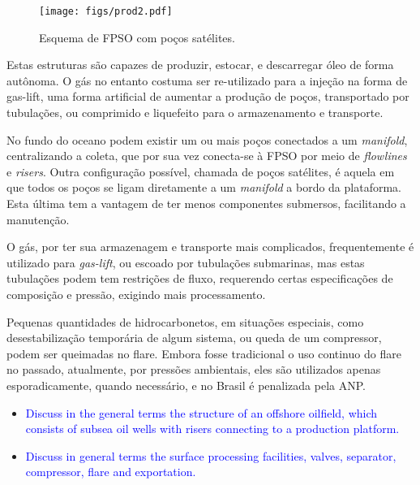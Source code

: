 \begin{figure}
\centering
  \texttt{[image: figs/prod2.pdf]}
  \caption{Esquema de FPSO com poços satélites.}
  \label{fig:fpso1}
\end{figure}





Estas estruturas são capazes de produzir, estocar, e descarregar óleo de forma autônoma. O gás no entanto costuma ser re-utilizado para a injeção na forma de gas-lift, uma forma artificial de aumentar a produção de poços, transportado por tubulações, ou comprimido e liquefeito para o armazenamento e transporte.

No fundo do oceano podem existir um ou mais poços conectados a um \textit{manifold}, centralizando a coleta, que por sua vez conecta-se à FPSO por meio de \textit{flowlines} e \textit{risers}. Outra configuração possível, chamada de poços satélites, é aquela em que todos os poços se ligam diretamente a um \textit{manifold} a bordo da plataforma. Esta última tem a vantagem de ter menos componentes submersos, facilitando a manutenção.


O gás, por ter sua armazenagem e transporte mais complicados, frequentemente é utilizado para \textit{gas-lift}, ou escoado por tubulações submarinas, mas estas tubulações podem tem restrições de fluxo, requerendo certas especificações de composição e pressão, exigindo mais processamento.

Pequenas quantidades de hidrocarbonetos, em situações especiais, como desestabilização temporária de algum sistema, ou queda de um compressor, podem ser queimadas no flare. Embora fosse tradicional o uso continuo do flare no passado, atualmente, por pressões ambientais, eles são utilizados apenas esporadicamente, quando necessário, e no Brasil é penalizada pela ANP.

\begin{itemize}

\item \textcolor{blue}{Discuss in the general terms the structure of an offshore oilfield, which consists of subsea oil wells with risers connecting to a production platform.}


\item \textcolor{blue}{Discuss in general terms the surface processing facilities, valves, separator, compressor, flare and exportation.}

\end{itemize}



